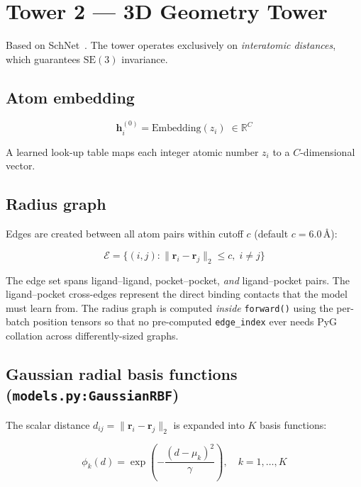 \documentclass[11pt,a4paper]{article}
\newcommand{\R}{\mathbb{R}}
\newcommand{\bh}{\mathbf{h}}
\newcommand{\br}{\mathbf{r}}
\newcommand{\code}[1]{\texttt{#1}}
\begin{document}
\section{Tower 2 --- 3D Geometry Tower}
\label{sec:tower2}

Based on SchNet~\cite{schutt2017}.  The tower operates exclusively on
\emph{interatomic distances}, which guarantees $\mathrm{SE}(3)$ invariance.

\subsection{Atom embedding}

\begin{equation}
\bh_i^{(0)} = \mathrm{Embedding}(z_i) \;\in \R^C
\end{equation}

A learned look-up table maps each integer atomic number $z_i$ to a $C$-dimensional
vector.

\subsection{Radius graph}

Edges are created between all atom pairs within cutoff $c$ (default $c = 6.0$\,\AA):

\begin{equation}
\mathcal{E} = \bigl\{(i,j) : \|\br_i - \br_j\|_2 \leq c,\; i \neq j\bigr\}
\end{equation}

The edge set spans ligand--ligand, pocket--pocket, \emph{and} ligand--pocket pairs.
The ligand--pocket cross-edges represent the direct binding contacts that the model
must learn from.  The radius graph is computed \emph{inside} \code{forward()}
using the per-batch position tensors so that no pre-computed \code{edge\_index}
ever needs PyG collation across differently-sized graphs.

\subsection{Gaussian radial basis functions (\code{models.py:GaussianRBF})}

The scalar distance $d_{ij} = \|\br_i - \br_j\|_2$ is expanded into $K$ basis
functions:

\begin{equation}
\phi_k(d) = \exp\!\left( -\frac{(d - \mu_k)^2}{\gamma} \right), \quad k = 1, \ldots, K
\label{eq:rbf}
\end{equation}
\end{document}
